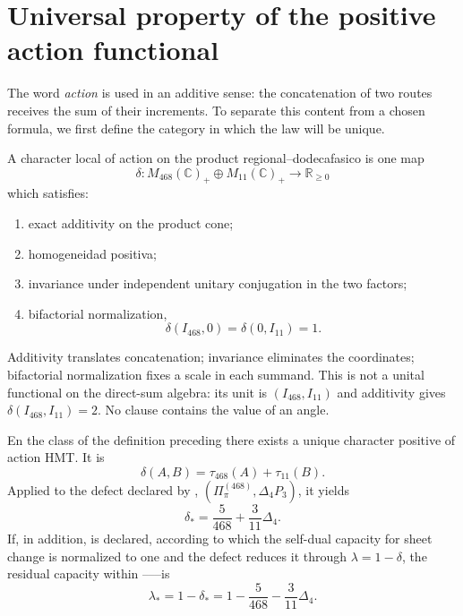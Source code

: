 \section{Universal property of the positive action functional}

The word \emph{action} is used in an additive sense: the concatenation of two
routes receives the sum of their increments. To separate this content from a
chosen formula, we first define the category in which the law will be unique.

\begin{definition}
\label{p3-20260826:def:caracter-accion-hmt}
A character local of action on the product
regional--dodecafasico is one map
\[
 \delta:
 M_{468}(\mathbb C)_+\oplus M_{11}(\mathbb C)_+
 \longrightarrow\mathbb R_{\ge0}
\]
which satisfies:
\begin{enumerate}
  \item exact additivity on the product cone;
  \item homogeneidad positiva;
  \item invariance under independent unitary conjugation in the two
  factors;
  \item bifactorial normalization,
  \[
  \delta(I_{468},0)=\delta(0,I_{11})=1.
  \]
\end{enumerate}
\end{definition}

Additivity translates concatenation; invariance eliminates the
coordinates; bifactorial normalization fixes a scale in each summand.
This is not a unital functional on the direct-sum algebra: its unit
is \((I_{468},I_{11})\) and additivity gives
\(\delta(I_{468},I_{11})=2\). No clause contains the value of an
angle.

\begin{theorem}
\label{p3-20260826:thm:ley-accion-hmt}
En the class of the definition preceding there exists a unique character positive of
action HMT\@. It is
\[
 \boxed{\delta(A,B)=\tau_{468}(A)+\tau_{11}(B).}
\]
Applied to the defect declared by \HDef,
\((\Pi_\pi^{(468)},\Delta_4P_3)\), it yields
\[
 \delta_*=\frac5{468}+\frac3{11}\Delta_4.
\]
If, in addition, \HRes is declared, according to which the self-dual capacity for sheet
change is normalized to one and the defect reduces it through
\(\lambda=1-\delta\), the residual capacity within \HTr--\HAdd--\HDef--\HRes is
\[
 \boxed{
 \lambda_*
 =1-\delta_*
 =1-\frac5{468}-\frac3{11}\Delta_4.
 }
\]
\end{theorem}

